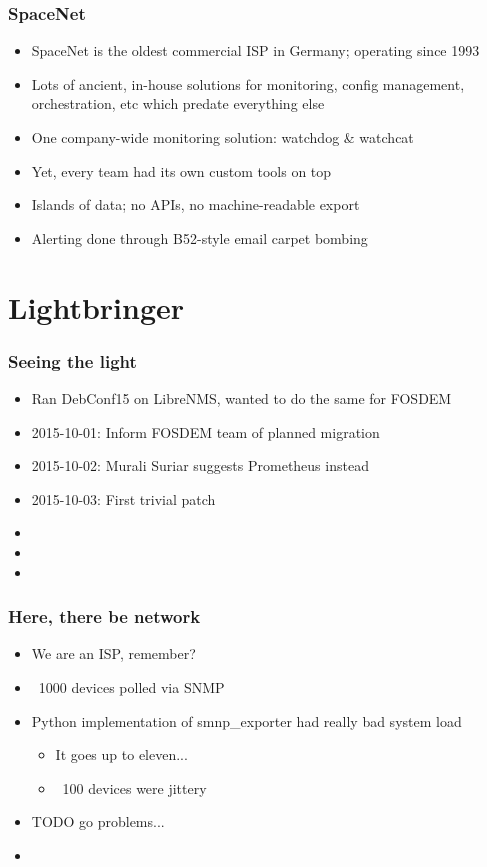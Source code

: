 \documentclass[t]{beamer}
\begin{document}
\begin{frame}
	\frametitle{SpaceNet}
	\begin{itemize}
		\item SpaceNet is the oldest commercial ISP in Germany; operating since 1993
		\item Lots of ancient, in-house solutions for monitoring, config management, orchestration, etc which predate everything else
		\item One company-wide monitoring solution: watchdog \& watchcat
		\item Yet, every team had its own custom tools on top
		\item Islands of data; no APIs, no machine-readable export
		\item Alerting done through B52-style email carpet bombing
	\end{itemize}
\end{frame}

\section{Lightbringer}

\begin{frame}
	\frametitle{Seeing the light}
	\begin{itemize}
		\item Ran DebConf15 on LibreNMS, wanted to do the same for FOSDEM
		\item 2015-10-01: Inform FOSDEM team of planned migration
		\item 2015-10-02: Murali Suriar suggests Prometheus instead
		\item 2015-10-03: First trivial patch
		\item 
		\item 
		\item 
	\end{itemize}
\end{frame}

\begin{frame}
	\frametitle{Here, there be network}
	\begin{itemize}
		\item We are an ISP, remember?
		\item ~1000 devices polled via SNMP
		\item Python implementation of smnp_exporter had really bad system load
		\begin{itemize}
			\item It goes up to eleven...
			\item ~100 devices were jittery
	\end{itemize}
		\item TODO go problems...
		\item 
	\end{itemize}
\end{frame}




\end{document}

